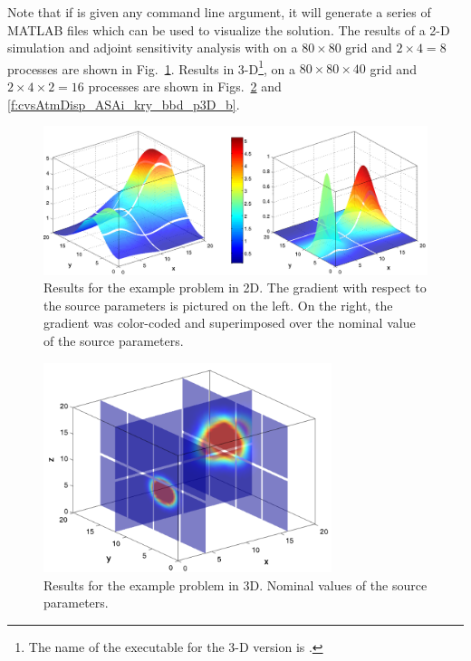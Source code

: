 Note that if  is given any command line argument,
it will generate a series of MATLAB files which can be used to visualize the solution.
The results of a 2-D simulation and adjoint sensitivity analysis with
 on a $80 \times 80$ grid and $2 \times 4 = 8$
processes are shown in Fig.~\ref{f:cvsAtmDisp_ASAi_kry_bbd_p2D}.
Results in 3-D\footnote{The name of the executable for the 3-D version is
.},  on a $80 \times 80 \times 40$ grid and 
$2 \times 4 \times 2= 16$ processes are shown in 
Figs.~\ref{f:cvsAtmDisp_ASAi_kry_bbd_p3D_a} and \ref{f:cvsAtmDisp_ASAi_kry_bbd_p3D_b}.
\begin{figure}
  {\centerline{\includegraphics[width=\textwidth]{cvsadjkryx_p2D}}}
  \caption{Results for the  example problem in 2D. 
    The gradient with respect to the source parameters is pictured on the left. 
    On the right, the gradient was color-coded and superimposed over the nominal value 
    of the source parameters.}
  \label{f:cvsAtmDisp_ASAi_kry_bbd_p2D}
\end{figure}
\begin{figure}
  {\centerline{\includegraphics[width=0.75\textwidth]{cvsadjkryx_p3Dcf}}}
  \caption{Results for the  example problem in 3D.
  Nominal values of the source parameters.}\label{f:cvsAtmDisp_ASAi_kry_bbd_p3D_a}
\end{figure}
